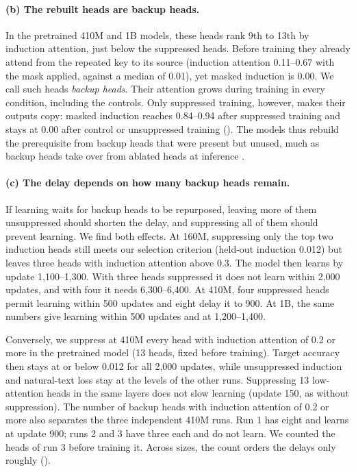 \paragraph{(b) The rebuilt heads are backup heads.}
In the pretrained 410M and 1B models, these heads rank 9th to 13th by induction
attention, just below the suppressed heads. Before training they already attend from
the repeated key to its source (induction attention 0.11--0.67 with the mask
applied, against a median of 0.01), yet masked induction is 0.00. We call such heads
\emph{backup heads}. Their attention grows during training in every condition,
including the controls. Only suppressed training, however, makes their outputs copy:
masked induction reaches 0.84--0.94 after suppressed training and stays at 0.00
after control or unsuppressed training (). The models thus
rebuild the prerequisite from backup heads that were present but unused, much as
backup heads take over from ablated heads at inference
\citep{wang2023ioi,gong2026coax}.

\paragraph{(c) The delay depends on how many backup heads remain.}
If learning waits for backup heads to be repurposed, leaving more of them
unsuppressed should shorten the delay, and suppressing all of them should prevent
learning. We find both effects. At 160M, suppressing only the top two induction
heads still meets our selection criterion (held-out induction 0.012) but leaves three
heads with induction attention above 0.3. The model then learns by update
1,100--1,300. With three heads suppressed it does not learn within 2,000 updates, and
with four it needs 6,300--6,400. At 410M, four suppressed heads permit learning
within 500 updates and eight delay it to 900. At 1B, the same numbers give learning
within 500 updates and at 1,200--1,400.

Conversely, we suppress at 410M every head with induction attention of 0.2 or more
in the pretrained model (13 heads, fixed before training). Target accuracy then stays
at or below 0.012 for all 2,000 updates, while unsuppressed induction and
natural-text loss stay at the levels of the other runs. Suppressing 13 low-attention
heads in the same layers does not slow learning (update 150, as without
suppression). The number of backup heads with induction attention of 0.2 or more
also separates the three independent 410M runs. Run 1 has eight and learns at update
900; runs 2 and 3 have three each and do not learn. We counted the heads of run 3
before training it. Across sizes, the count orders the delays only roughly
().

